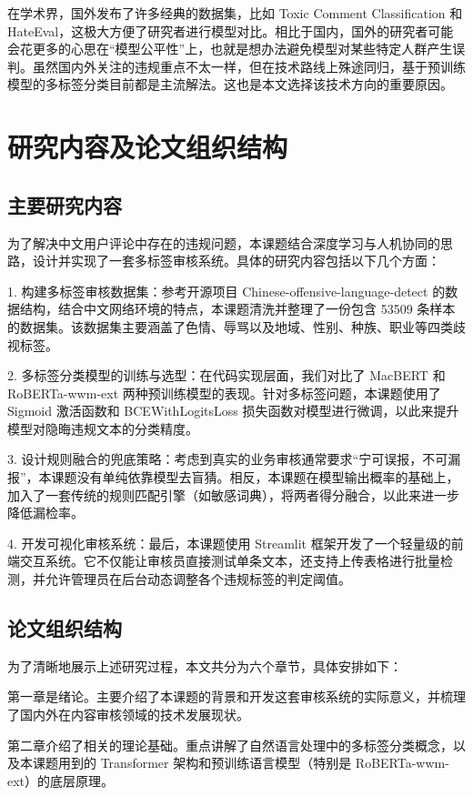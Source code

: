 \documentclass[twoside]{thesis-cls-Miya} %
\begin{document}
在学术界，国外发布了许多经典的数据集，比如 Toxic Comment Classification 和 HateEval，这极大方便了研究者进行模型对比。相比于国内，国外的研究者可能会花更多的心思在“模型公平性”上，也就是想办法避免模型对某些特定人群产生误判。虽然国内外关注的违规重点不太一样，但在技术路线上殊途同归，基于预训练模型的多标签分类目前都是主流解法。这也是本文选择该技术方向的重要原因。

\section{研究内容及论文组织结构}

\subsection{主要研究内容}

为了解决中文用户评论中存在的违规问题，本课题结合深度学习与人机协同的思路，设计并实现了一套多标签审核系统。具体的研究内容包括以下几个方面：

1. 构建多标签审核数据集：参考开源项目 Chinese-offensive-language-detect 的数据结构，结合中文网络环境的特点，本课题清洗并整理了一份包含 53509 条样本的数据集。该数据集主要涵盖了色情、辱骂以及地域、性别、种族、职业等四类歧视标签。

2. 多标签分类模型的训练与选型：在代码实现层面，我们对比了 MacBERT 和 RoBERTa-wwm-ext 两种预训练模型的表现。针对多标签问题，本课题使用了 Sigmoid 激活函数和 BCEWithLogitsLoss 损失函数对模型进行微调，以此来提升模型对隐晦违规文本的分类精度。

3. 设计规则融合的兜底策略：考虑到真实的业务审核通常要求“宁可误报，不可漏报”，本课题没有单纯依靠模型去盲猜。相反，本课题在模型输出概率的基础上，加入了一套传统的规则匹配引擎（如敏感词典），将两者得分融合，以此来进一步降低漏检率。

4. 开发可视化审核系统：最后，本课题使用 Streamlit 框架开发了一个轻量级的前端交互系统。它不仅能让审核员直接测试单条文本，还支持上传表格进行批量检测，并允许管理员在后台动态调整各个违规标签的判定阈值。

\subsection{论文组织结构}

为了清晰地展示上述研究过程，本文共分为六个章节，具体安排如下：

第一章是绪论。主要介绍了本课题的背景和开发这套审核系统的实际意义，并梳理了国内外在内容审核领域的技术发展现状。

第二章介绍了相关的理论基础。重点讲解了自然语言处理中的多标签分类概念，以及本课题用到的 Transformer 架构和预训练语言模型（特别是 RoBERTa-wwm-ext）的底层原理。
\end{document}
